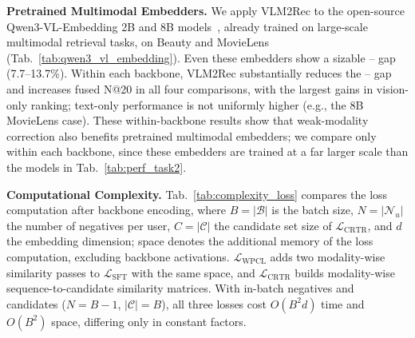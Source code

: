 \noindent\textbf{Pretrained Multimodal Embedders.}
\label{app:embedding_vlm_transfer}
We apply VLM2Rec to the open-source Qwen3-VL-Embedding 2B and 8B models~\cite{qwen3_vl_embedding}, already trained on large-scale multimodal retrieval tasks, on Beauty and MovieLens (Tab.~\ref{tab:qwen3_vl_embedding}).
Even these embedders show a sizable \TEXTset{}--\VISIONset{} gap (7.7--13.7\%).
Within each backbone, VLM2Rec substantially reduces the \TEXTset{}--\VISIONset{} gap and increases fused N@20 in all four comparisons, with the largest gains in vision-only ranking; text-only performance is not uniformly higher (e.g., the 8B MovieLens case).
These within-backbone results show that weak-modality correction also benefits pretrained multimodal embedders; we compare only within each backbone, since these embedders are trained at a far larger scale than the models in Tab.~\ref{tab:perf_task2}.

\begin{table}[!h]
\centering
\caption{Time and space complexity of the loss objectives.}
\renewcommand{\arraystretch}{0.8}
\setlength{\tabcolsep}{3pt}
\label{tab:complexity_loss}
\end{table}

\noindent\textbf{Computational Complexity.}
\label{app:complexity}
Tab.~\ref{tab:complexity_loss} compares the loss computation after backbone encoding, where $B = |\mathcal{B}|$ is the batch size, $N=|\mathcal{N}_u|$ the number of negatives per user, $C=|\mathcal{C}|$ the candidate set size of $\mathcal{L}_{\text{CRTR}}$, and $d$ the embedding dimension; space denotes the additional memory of the loss computation, excluding backbone activations.
$\mathcal{L}_{\text{WPCL}}$ adds two modality-wise similarity passes to $\mathcal{L}_{\text{SFT}}$ with the same space, and $\mathcal{L}_{\text{CRTR}}$ builds modality-wise sequence-to-candidate similarity matrices.
With in-batch negatives and candidates ($N=B-1$, $|\mathcal{C}|=B$), all three losses cost $O(B^2d)$ time and $O(B^2)$ space, differing only in constant factors.

